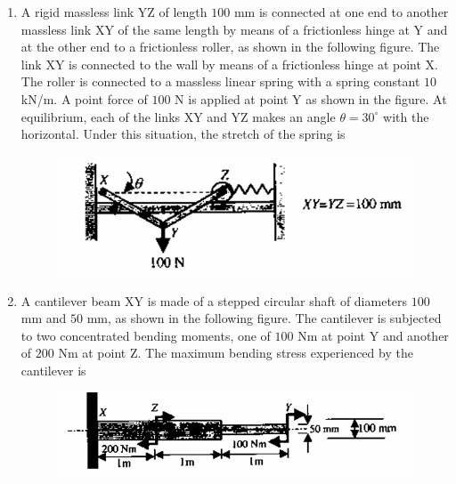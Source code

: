 \documentclass[journal,12pt,onecolumn]{IEEEtran}
\theoremstyle{remark}
\begin{document}
\begin{enumerate}
\item A rigid massless link YZ of length $100$ mm is connected at one end to another massless link XY of the same length by means of a frictionless hinge at Y and at the other end to a frictionless roller, as shown in the following figure. The link XY is connected to the wall by means of a frictionless hinge at point X. The roller is connected to a massless linear spring with a spring constant $10$ kN/m. A point force of $100$ N is applied at point Y as shown in the figure. At equilibrium, each of the links XY and YZ makes an angle $\theta = 30^{\circ}$ with the horizontal. Under this situation, the stretch of the spring  is
\begin{figure}[h]
\centering
\includegraphics[width=0.6\columnwidth]{q36.png}
\caption*{}
\label{fig:q36}
\end{figure}
\hfill{}
\begin{enumerate}
\end{enumerate}

\item A cantilever beam XY is made of a stepped circular shaft of diameters $100$ mm and $50$ mm, as shown in the following figure. The cantilever is subjected to two concentrated bending moments, one of $100$ Nm at point Y and another of $200$ Nm at point Z. The maximum bending stress  experienced by the cantilever is
\begin{figure}[h]
\centering
\includegraphics[width=0.8\columnwidth]{q37.png}
\caption*{}
\label{fig:q37}
\end{figure}
\hfill{}
\begin{enumerate}
\end{enumerate}


\end{enumerate}
\end{document}
